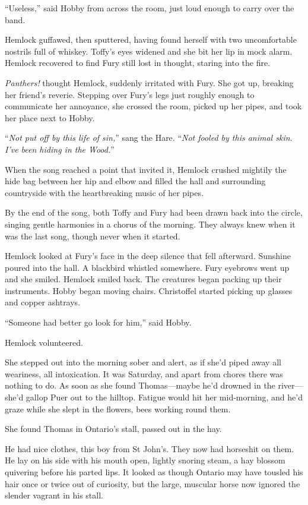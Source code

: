 \documentclass[11pt,a5paper]{article}
\begin{document}
``Useless,'' said Hobby from across the room, just loud enough to carry over the band.

Hemlock guffawed, then sputtered, having found herself with two uncomfortable nostrils full of whiskey. Toffy's eyes widened and she bit her lip in mock alarm. Hemlock recovered to find Fury still lost in thought, staring into the fire.

\emph{Panthers!} thought Hemlock, suddenly irritated with Fury. She got up, breaking her friend's reverie. Stepping over Fury's legs just roughly enough to communicate her annoyance, she crossed the room, picked up her pipes, and took her place next to Hobby.

``\emph{Not put off by this life of sin,}'' sang the Hare. ``\emph{Not fooled by this animal skin. I've been hiding in the Wood.}''

When the song reached a point that invited it, Hemlock crushed mightily the hide bag between her hip and elbow and filled the hall and surrounding countryside with the heartbreaking music of her pipes.

By the end of the song, both Toffy and Fury had been drawn back into the circle, singing gentle harmonies in a chorus of the morning. They always knew when it was the last song, though never when it started.

Hemlock looked at Fury's face in the deep silence that fell afterward. Sunshine poured into the hall. A blackbird whistled somewhere. Fury eyebrows went up and she smiled. Hemlock smiled back. The creatures began packing up their instruments. Hobby began moving chairs. Christoffel started picking up glasses and copper ashtrays.

``Someone had better go look for him,'' said Hobby.

Hemlock volunteered.

She stepped out into the morning sober and alert, as if she'd piped away all weariness, all intoxication. It was Saturday, and apart from chores there was nothing to do. As soon as she found Thomas---maybe he'd drowned in the river---she'd gallop Puer out to the hilltop. Fatigue would hit her mid-morning, and he'd graze while she slept in the flowers, bees working round them.

\vspace{1em}

She found Thomas in Ontario's stall, passed out in the hay.

He had nice clothes, this boy from St John's. They now had horseshit on them. He lay on his side with his mouth open, lightly snoring steam, a hay blossom  quivering before his parted lips. It looked as though Ontario may have tousled his hair once or twice out of curiosity, but the large, muscular horse now ignored the slender vagrant in his stall.
\end{document}
